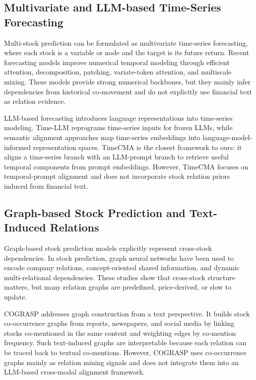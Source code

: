 \documentclass[11pt]{article}
\begin{document}
\subsection{Multivariate and LLM-based Time-Series Forecasting}

Multi-stock prediction can be formulated as multivariate time-series forecasting, where each stock is a variable or node and the target is its future return. Recent forecasting models improve numerical temporal modeling through efficient attention, decomposition, patching, variate-token attention, and multiscale mixing. These models provide strong numerical backbones, but they mainly infer dependencies from historical co-movement and do not explicitly use financial text as relation evidence.

LLM-based forecasting introduces language representations into time-series modeling. Time-LLM reprograms time-series inputs for frozen LLMs, while semantic alignment approaches map time-series embeddings into language-model-informed representation spaces. TimeCMA is the closest framework to ours: it aligns a time-series branch with an LLM-prompt branch to retrieve useful temporal components from prompt embeddings. However, TimeCMA focuses on temporal-prompt alignment and does not incorporate stock relation priors induced from financial text.

\subsection{Graph-based Stock Prediction and Text-Induced Relations}

Graph-based stock prediction models explicitly represent cross-stock dependencies. In stock prediction, graph neural networks have been used to encode company relations, concept-oriented shared information, and dynamic multi-relational dependencies. These studies show that cross-stock structure matters, but many relation graphs are predefined, price-derived, or slow to update.

COGRASP addresses graph construction from a text perspective. It builds stock co-occurrence graphs from reports, newspapers, and social media by linking stocks co-mentioned in the same content and weighting edges by co-mention frequency. Such text-induced graphs are interpretable because each relation can be traced back to textual co-mentions. However, COGRASP uses co-occurrence graphs mainly as relation mining signals and does not integrate them into an LLM-based cross-modal alignment framework.
\end{document}
